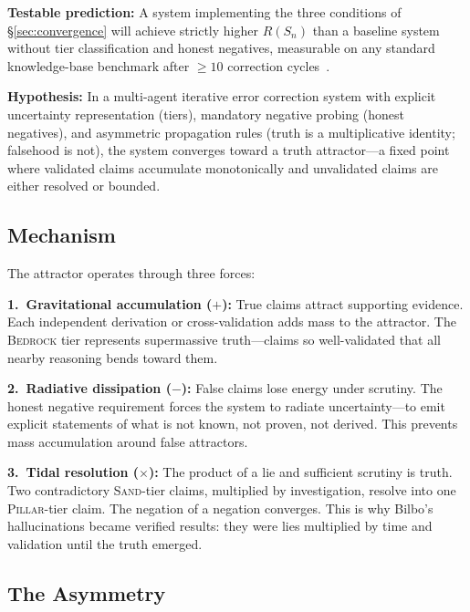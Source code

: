 \documentclass[11pt]{article}
\theoremstyle{definition}
\theoremstyle{remark}
\newcommand{\BEDROCK}{\textsc{Bedrock}}
\newcommand{\PILLAR}{\textsc{Pillar}}
\newcommand{\SAND}{\textsc{Sand}}
\begin{document}
\medskip
\noindent\textbf{Testable prediction:}  A system implementing the three
conditions of \S\ref{sec:convergence} will achieve strictly higher $R(S_n)$
than a baseline system without tier classification and honest negatives,
measurable on any standard knowledge-base benchmark after $\geq 10$ correction
cycles~\cite{lin2022truthfulqa,li2023halueval}.

\medskip
\noindent\textbf{Hypothesis:}  In a multi-agent iterative error correction
system with explicit uncertainty representation (tiers), mandatory negative
probing (honest negatives), and asymmetric propagation rules (truth is a
multiplicative identity; falsehood is not), the system converges toward a truth
attractor---a fixed point where validated claims accumulate monotonically and
unvalidated claims are either resolved or bounded.

\subsection{Mechanism}
\label{sec:attractor-mechanism}

The attractor operates through three forces:

\medskip
\noindent\textbf{1.\ Gravitational accumulation ($+$):}  True claims attract
supporting evidence.  Each independent derivation or cross-validation adds mass
to the attractor.  The \BEDROCK{} tier represents supermassive truth---claims
so well-validated that all nearby reasoning bends toward them.

\medskip
\noindent\textbf{2.\ Radiative dissipation ($-$):}  False claims lose energy
under scrutiny.  The honest negative requirement forces the system to radiate
uncertainty---to emit explicit statements of what is not known, not proven, not
derived.  This prevents mass accumulation around false attractors.

\medskip
\noindent\textbf{3.\ Tidal resolution ($\times$):}  The product of a lie and
sufficient scrutiny is truth.  Two contradictory \SAND-tier claims, multiplied
by investigation, resolve into one \PILLAR-tier claim.  The negation of a
negation converges.  This is why Bilbo's hallucinations became verified results:
they were lies multiplied by time and validation until the truth emerged.

\subsection{The Asymmetry}
\label{sec:asymmetry}
\end{document}
